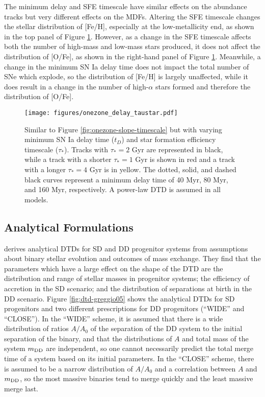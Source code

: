 \documentclass[twocolumn,linenumbers,twocolappendix]{aastex631}
\begin{document}
The minimum delay and SFE timescale have similar effects on the abundance tracks but very different effects on the MDFs. Altering the SFE timescale changes the stellar distribution of [Fe/H], especially at the low-metallicity end, as shown in the top panel of Figure \ref{fig:onezone-delay-taustar}. However, as a change in the SFE timescale affects both the number of high-mass and low-mass stars produced, it does not affect the distribution of [O/Fe], as shown in the right-hand panel of Figure \ref{fig:onezone-delay-taustar}. Meanwhile, a change in the minimum SN Ia delay time does not impact the total number of SNe which explode, so the distribution of [Fe/H] is largely unaffected, while it does result in a change in the number of high-$\alpha$ stars formed and therefore the distribution of [O/Fe].

\begin{figure}
    \centering
    \texttt{[image: figures/onezone\_delay\_taustar.pdf]}
    \caption{Similar to Figure \ref{fig:onezone-slope-timescale} but with varying minimum SN Ia delay time ($t_D$) and star formation efficiency timescale ($\tau_*$). Tracks with $\tau_*=2$ Gyr are represented in black, while a track with a shorter $\tau_*=1$ Gyr is shown in red and a track with a longer $\tau_*=4$ Gyr is in yellow. The dotted, solid, and dashed black curves represent a minimum delay time of 40 Myr, 80 Myr, and 160 Myr, respectively. A power-law DTD is assumed in all models.}
    \label{fig:onezone-delay-taustar}
\end{figure}

\subsection{Analytical Formulations}

\citet{Greggio2005-AnalyticalRates} derives analytical DTDs for SD and DD progenitor systems from assumptions about binary stellar evolution and outcomes of mass exchange. They find that the parameters which have a large effect on the shape of the DTD are the distribution and range of stellar masses in progenitor systems; the efficiency of accretion in the SD scenario; and the distribution of separations at birth in the DD scenario. Figure \ref{fig:dtd-greggio05} shows the analytical DTDs for SD progenitors and two different prescriptions for DD progenitors (``WIDE'' and ``CLOSE''). In the ``WIDE'' scheme, it is assumed that there is a wide distribution of ratios $A/A_0$ of the separation of the DD system to the initial separation of the binary, and that the distributions of $A$ and total mass of the system $m_{\rm{DD}}$ are independent, so one cannot necessarily predict the total merge time of a system based on its initial parameters. In the ``CLOSE'' scheme, there is assumed to be a narrow distribution of $A/A_0$ and a correlation between $A$ and $m_{\rm{DD}}$, so the most massive binaries tend to merge quickly and the least massive merge last.
\end{document}
